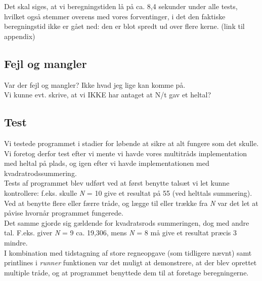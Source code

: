 \documentclass[main.tex]{subfile}
\begin{document}
Det skal siges, at vi beregningstiden lå på ca. 8,4 sekunder under alle tests, hvilket også stemmer overens med vores forventinger, i det den faktiske beregningstid ikke er gået ned: den er blot spredt ud over flere kerne. (link til appendix)

\subsection{Fejl og mangler}
Var der fejl og mangler? Ikke hvad jeg lige kan komme på.\\

Vi kunne evt. skrive, at vi IKKE har antaget at N/t gav et heltal?

\subsection{Test}
Vi testede programmet i stadier for løbende at sikre at alt fungere som det skulle. Vi foretog derfor test efter vi mente vi havde vores multitråds implementation med heltal på plads, og igen efter vi havde implementationen med kvadratrodssummering.\\

Tests af programmet blev udført ved at først benytte talsæt vi let kunne kontrollere: f.eks. skulle \textit{N} = 10 give et resultat på 55 (ved helttals summering). Ved at benytte flere eller færre tråde, og lægge til eller trække fra \textit{N} var det let at påvise hvornår programmet fungerede.\\

Det samme gjorde sig gældende for kvadratsrods summeringen, dog med andre tal. F.eks. giver \textit{N} = 9 ca. 19,306, mens \textit{N} = 8 må give et resultat præcis 3 mindre.\\

I kombination med tidstagning af store regneopgave (som tidligere nævnt) samt printlines i \textit{runner} funktionen var det muligt at demonstrere, at der blev oprettet multiple tråde, og at programmet benyttede dem til at foretage beregningerne.
\end{document}
